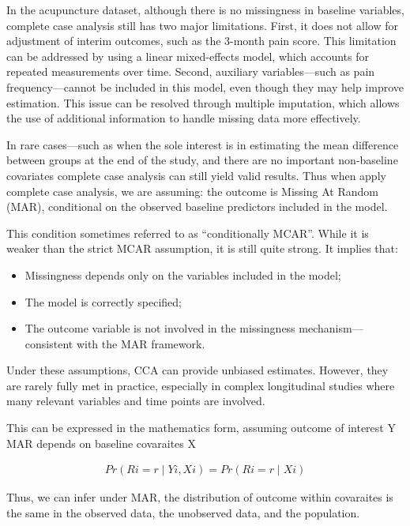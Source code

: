 \documentclass{article}
\providecommand{\tightlist}{%
  \setlength{\itemsep}{0pt}\setlength{\parskip}{0pt}}
\begin{document}
In the acupuncture dataset, although there is no missingness in baseline
variables, complete case analysis still has two major limitations.
First, it does not allow for adjustment of interim outcomes, such as the
3-month pain score. This limitation can be addressed by using a linear
mixed-effects model, which accounts for repeated measurements over time.
Second, auxiliary variables---such as pain frequency---cannot be
included in this model, even though they may help improve estimation.
This issue can be resolved through multiple imputation, which allows the
use of additional information to handle missing data more effectively.

In rare cases---such as when the sole interest is in estimating the mean
difference between groups at the end of the study, and there are no
important non-baseline covariates complete case analysis can still yield
valid results. Thus when apply complete case analysis, we are assuming:
the outcome is Missing At Random (MAR), conditional on the observed
baseline predictors included in the model.

This condition sometimes referred to as ``conditionally MCAR''. While it
is weaker than the strict MCAR assumption, it is still quite strong. It
implies that:

\begin{itemize}
\tightlist
\item
  Missingness depends only on the variables included in the model;
\item
  The model is correctly specified;
\item
  The outcome variable is not involved in the missingness
  mechanism---consistent with the MAR framework.
\end{itemize}

Under these assumptions, CCA can provide unbiased estimates. However,
they are rarely fully met in practice, especially in complex
longitudinal studies where many relevant variables and time points are
involved.

This can be expressed in the mathematics form, assuming outcome of
interest Y MAR depends on baseline covaraites X

\begin{align*}
  Pr(Ri=r \mid Yi, Xi) = Pr(Ri=r \mid Xi)
  \end{align*}

Thus, we can infer under MAR, the distribution of outcome within
covaraites is the same in the observed data, the unobserved data, and
the population.
\end{document}
